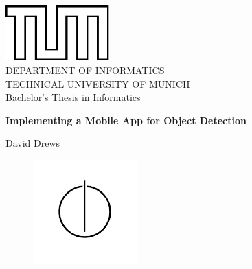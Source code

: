 \documentclass[
			   fontsize=11pt,
               paper=a4,
               bibliography=totoc,
               idxtotoc,
               headsepline,
               footsepline,
               footinclude=false,
               BCOR=12mm,
               DIV=13,
               openany,   %
               ]
               {scrbook}
\def\doctype{Bachelor's Thesis\xspace}
\def\studyProgram{Informatics}
\def\title{Implementing a Mobile App for Object Detection}
\def\author{David Drews}
\begin{document}
\frontmatter

\def\bcorcor{0.15cm}
\addtolength{\hoffset}{\bcorcor}
\thispagestyle{empty}
\vspace{4cm}
\begin{center}
    \includegraphics[width=4cm]{templateStuff/tumlogo.pdf}\\[5mm]
    \huge DEPARTMENT OF INFORMATICS\\[5mm]
    \large TECHNICAL UNIVERSITY OF MUNICH\\[24mm]

    {\Large \doctype in \studyProgram}\\[20mm]
    {\huge\bf \title\par}
    \vspace{15mm}
    {\LARGE  \author}
    \vspace{10mm}
    \begin{figure}[h!]
        \centering
        \includegraphics[width=4cm]{templateStuff/informat.pdf}
   \end{figure}
\end{center}

\cleardoubleemptypage

\end{document}
